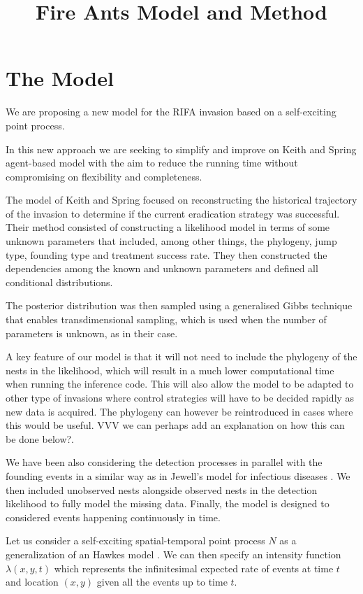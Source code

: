 \documentclass[11pt,a4paper]{article}
\title{Fire Ants Model and Method}
\begin{document}
 \maketitle

\section{The Model}

We are proposing a new model for the RIFA invasion based on a self-exciting point process.

In this new approach we are seeking to simplify and improve on Keith and Spring agent-based model \cite{Keith} with the aim to reduce the running time without compromising on flexibility and completeness.

The model of Keith and Spring focused on reconstructing the historical trajectory of the invasion to determine if the current eradication strategy was successful. Their method consisted of constructing a likelihood model in terms of some unknown parameters that included, among other things, the phylogeny, jump type, founding type and treatment success rate. They then constructed the dependencies among the known and unknown parameters and defined all conditional distributions.

The posterior distribution was then sampled using a generalised Gibbs technique that enables transdimensional sampling, which is used when the number of parameters is unknown, as in their case.

A key feature of our model is that it will not need to include the phylogeny of the nests in the likelihood, which will result in a much lower computational time when running the inference code. This will also allow the model to be adapted to other type of invasions where control strategies will have to be decided rapidly as new data is acquired. {\color{red}The phylogeny can however be reintroduced in cases where this would be useful. VVV we can perhaps add an explanation on how this can be done below?}.

We have been also considering the detection processes in parallel with the founding events in a similar way as in Jewell's model for infectious diseases \cite{Jewell}. We then included unobserved nests alongside observed nests in the detection likelihood to fully model the missing data. Finally, the model is designed to considered events happening continuously in time.

Let us consider a self-exciting spatial-temporal point process $N$ as a generalization of an Hawkes model {\color{red} \cite{Hawkes71}}. We can then specify an intensity function $\lambda(x, y, t)$ which represents the infinitesimal expected  rate of events at time $t$ and location $(x, y)$  given all the events up to time $t$.
\end{document}
